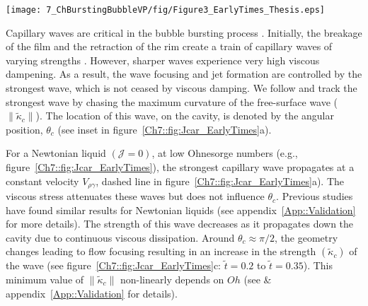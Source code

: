 \begin{sidewaysfigure}
	\centering
	\texttt{[image: 7\_ChBurstingBubbleVP/fig/Figure3\_EarlyTimes\_Thesis.eps]}
	\caption{Effects of viscoplasticity on the traveling capillary waves: (a) Variation of the location $\left(\theta_c\right)$ of strongest capillary with time. The gray dotted line denotes the Newtonian limit, $\theta_c -\theta_i \sim -\tilde t$ as described by \citep{gordillo2019capillary}. (b) Variation of the strength $\left(\|\tilde \kappa_c\|\right)$ of the strongest capillary wave with time. Snapshots of the deformation tensor modulus $\|\boldsymbol{\tilde{\mathcal{D}}}\|$ for $\mathcal{J} =$ (c) $0.2$, and (d) $1.0$. Here, time is normalized with the inertio-capilary time scale, $\tau_{\rho\gamma} = \sqrt{\rho_d R_0^3/\gamma}$. For all the cases in this figure, $Oh = 10^{-2}$. Also see supplemental movies {\color{Myfig} 5 -- 7}.}
	\label{Ch7::fig:Jcar_EarlyTimes}
\end{sidewaysfigure}

Capillary waves are critical in the bubble bursting process \citep{gordillo2019capillary}. Initially, the breakage of the film and the retraction of the rim create a train of capillary waves of varying strengths \citep{gekle2009high}. However, sharper waves experience very high viscous dampening. As a result, the wave focusing and jet formation are controlled by the strongest wave, which is not ceased by viscous damping. We follow \citet{gordillo2019capillary} and track the strongest wave by chasing the maximum curvature of the free-surface wave ($\|\tilde \kappa_c\|$). The location of this wave, on the cavity, is denoted by the angular position, $\theta_c$ (see inset in figure~\ref{Ch7::fig:Jcar_EarlyTimes}a). 

For a Newtonian liquid $\left(\mathcal{J} = 0\right)$, at low Ohnesorge numbers (e.g., figure~\ref{Ch7::fig:Jcar_EarlyTimes}), the strongest capillary wave propagates at a constant velocity $V_{\rho\gamma}$, dashed line in figure~\ref{Ch7::fig:Jcar_EarlyTimes}a). The viscous stress attenuates these waves but does not influence $\theta_c$. Previous studies \citep{krishnan2017scaling, gordillo2019capillary} have found similar results for Newtonian liquids (see appendix~\ref{App::Validation} for more details). The strength of this wave decreases as it propagates down the cavity due to continuous viscous dissipation. Around $\theta_c \approx \pi/2$, the geometry changes leading to flow focusing resulting in an increase in the strength $\left(\tilde \kappa_c\right)$ of the wave (see figure~\ref{Ch7::fig:Jcar_EarlyTimes}c: $\tilde t = 0.2$ to $\tilde t = 0.35$). This minimum value of $\|\tilde \kappa_c\|$ non-linearly depends on $Oh$ (see \citet{gordillo2019capillary} \& appendix~\ref{App::Validation} for details).


